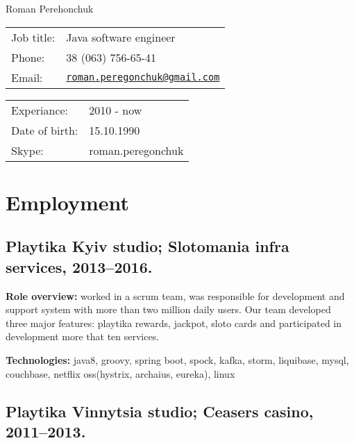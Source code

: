 \documentclass[letterpaper]{article}
\def\name{Roman Perehonchuk}
\renewenvironment{itemize}{
  \begin{list}{}{
    \setlength{\leftmargin}{1.5em}
  }
}{
  \end{list}
}
\begin{document}
{\huge \name}


\vspace{0.25in}

\begin{minipage}{0.45\linewidth}
  \begin{tabular}{ll}
    Job title: & Java software engineer \\
    Phone: & 38 (063) 756-65-41 \\
    Email: & \href{mailto:roman.peregonchuk@gmail.com}{\tt roman.peregonchuk@gmail.com} \\
  \end{tabular}
\end{minipage}
\begin{minipage}{0.45\linewidth}
  \begin{tabular}{ll}
    Experiance: & 2010 - now \\
    Date of birth: & 15.10.1990 \\
    Skype: & roman.peregonchuk \\
  \end{tabular}
\end{minipage}

\section*{Employment}

\subsection*{Playtika Kyiv studio; Slotomania infra services, 2013--2016.}

\begin{itemize}
\item \textbf{Role overview:} worked in a scrum team, was responsible for development and support system with more than two million daily users. Our team developed three major features: playtika rewards, jackpot, sloto cards and participated in development more that ten services.
\item \textbf{Technologies:} java8, groovy, spring boot, spock, kafka, storm, liquibase, mysql, couchbase, netflix oss(hystrix, archaius, eureka), linux  
\end{itemize}

\subsection*{Playtika Vinnytsia studio; Ceasers casino, 2011--2013.}
\end{document}
